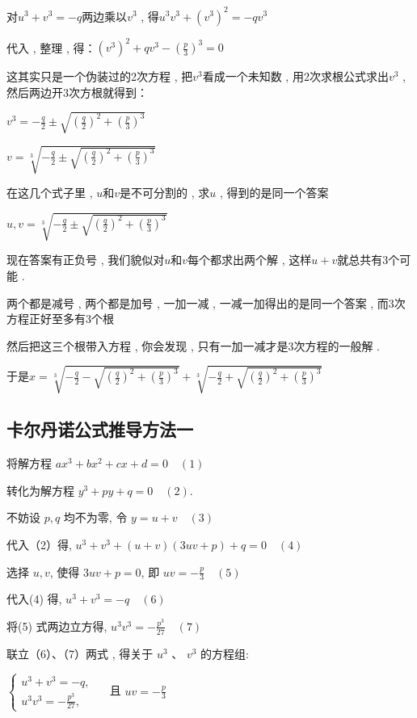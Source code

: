 对$u^3+v^3=-q$两边乘以$v^3$ , 得$ u^{3} v^{3}+\left(v^{3}\right)^{2}=-q v^{3}$

代入 , 整理 , 得：$\left(v^{3}\right)^{2}+q v^{3}-\left(\frac{p}{3}\right)^{3}=0$

这其实只是一个伪装过的2次方程 , 把$v^3$看成一个未知数 , 用2次求根公式求出$v^3$ , 然后两边开3次方根就得到：

$v^{3}=-\frac{q}{2} \pm \sqrt{\left(\frac{q}{2}\right)^{2}+\left(\frac{p}{3}\right)^{3}}$

$v=\sqrt[3]{-\frac{q}{2} \pm \sqrt{\left(\frac{q}{2}\right)^{2}+\left(\frac{p}{3}\right)^{3}}}$

在这几个式子里 , $u$和$v$是不可分割的 , 求$u$ , 得到的是同一个答案

$u,v=\sqrt[3]{-\frac{q}{2} \pm \sqrt{\left(\frac{q}{2}\right)^{2}+\left(\frac{p}{3}\right)^{3}}}$

现在答案有正负号 , 我们貌似对$u$和$v$每个都求出两个解 , 这样$u+v$就总共有3个可能 . 

两个都是减号 , 两个都是加号 , 一加一减 , 一减一加得出的是同一个答案 , 而3次方程正好至多有3个根

然后把这三个根带入方程 , 你会发现 , 只有一加一减才是3次方程的一般解 . 

于是$x=\sqrt[3]{-\frac{q}{2}-\sqrt{\left(\frac{q}{2}\right)^{2}+\left(\frac{p}{3}\right)^{3}}}+\sqrt[3]{-\frac{q}{2}+\sqrt{\left(\frac{q}{2}\right)^{2}+\left(\frac{p}{3}\right)^{3}}}$



\subsection{卡尔丹诺公式推导方法一}
将解方程 $a x^{3}+b x^{2}+c x+d=0 \quad (1)$ 

转化为解方程 $y^{3}+p y+q=0 \quad (2).$ 

不妨设 $p,q$ 均不为零, 令 $y=u+v \quad (3)$  

代入（2）得, $u^{3}+v^{3}+(u+v)(3 u v+p)+q=0 \quad (4)$

选择 $u,v$, 使得 $3 u v+p=0$, 即 $u v=-\frac{p}{3} \quad (5)$ 

代入(4) 得, $u^{3}+v^{3}=-q \quad (6) $ 

将(5) 式两边立方得, $u^{3} v^{3}=-\frac{p^{3}}{27} \quad (7)$

联立（6）、（7）两式 , 得关于 $u^{3}$ 、 $v^{3}$ 的方程组:

$\left\{
\begin{array}{l}
	u^{3}+v^{3}=-q ,  \\ 
	u^{3} v^{3}=-\frac{p^{3}}{27} , 
\end{array} \quad\right.$ 
且 $u v=-\frac{p}{3}$

